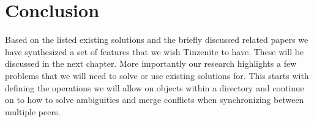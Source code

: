 \section{Conclusion}
\label{sec:Conclusion}

Based on the listed existing solutions and the briefly discussed related papers we have synthesized a set of features that we wish Tinzenite to have.
These will be discussed in the next chapter.
More importantly our research highlights a few problems that we will need to solve or use existing solutions for.
This starts with defining the operations we will allow on objects within a directory and continue on to how to solve ambiguities and merge conflicts when synchronizing between multiple peers.
